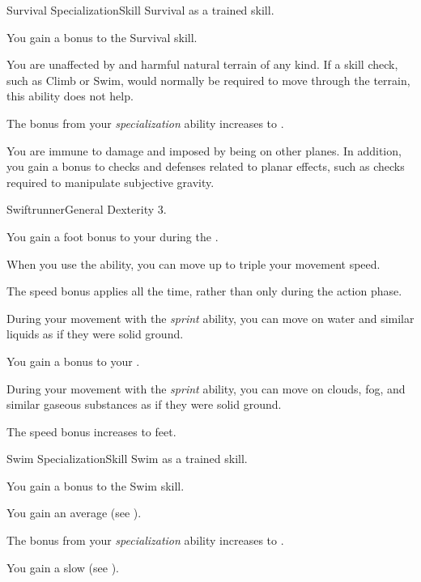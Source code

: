   \begin{feat}{Survival Specialization}{Skill}
    \featpre Survival as a trained skill.

     You gain a  bonus to the Survival skill.

     You are unaffected by  and harmful natural terrain of any kind.
    If a skill check, such as Climb or Swim, would normally be required to move through the terrain, this ability does not help.

     The bonus from your \textit{specialization} ability increases to .

     You are immune to damage and  imposed by being on other planes.
    In addition, you gain a  bonus to checks and defenses related to planar effects, such as checks required to manipulate subjective gravity.
  \end{feat}

  \begin{feat}{Swiftrunner}{General}
    \featpre Dexterity 3.

     You gain a  foot bonus to your  during the .

     When you use the  ability, you can move up to triple your movement speed.

     The speed bonus applies all the time, rather than only during the action phase.

     During your movement with the \textit{sprint} ability, you can move on water and similar liquids as if they were solid ground.

     You gain a  bonus to your .

     During your movement with the \textit{sprint} ability, you can move on clouds, fog, and similar gaseous substances as if they were solid ground.

     The speed bonus increases to  feet.
  \end{feat}

  \begin{feat}{Swim Specialization}{Skill}
    \featpre Swim as a trained skill.

     You gain a  bonus to the Swim skill.

     You gain an average  (see ).

     The bonus from your \textit{specialization} ability increases to .

     You gain a slow  (see ).
  \end{feat}

